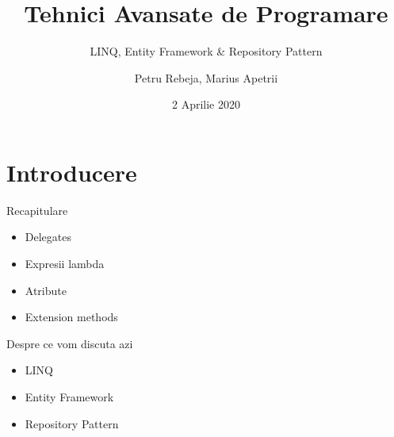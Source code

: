 \documentclass[presentation]{beamer}
\author{Petru Rebeja, Marius Apetrii}
\date{2 Aprilie 2020}
\title{Tehnici Avansate de Programare}
\subtitle{LINQ, Entity Framework \& Repository Pattern}
\institute[UAIC]{Facultatea de Matematică\\Universitatea Alexandru Ioan Cuza, Iași}
\begin{document}
\maketitle
\section{Introducere}
\label{sec:org764d22f}
\begin{frame}[label={sec:org7a980c1}]{Recapitulare}
\begin{itemize}
\item Delegates
\item Expresii lambda
\item Atribute
\item Extension methods
\end{itemize}
\end{frame}
\begin{frame}[label={sec:org1203f17}]{Despre ce vom discuta azi}
\begin{itemize}
\item LINQ
\item Entity Framework
\item Repository Pattern
\end{itemize}
\end{frame}
\end{document}
